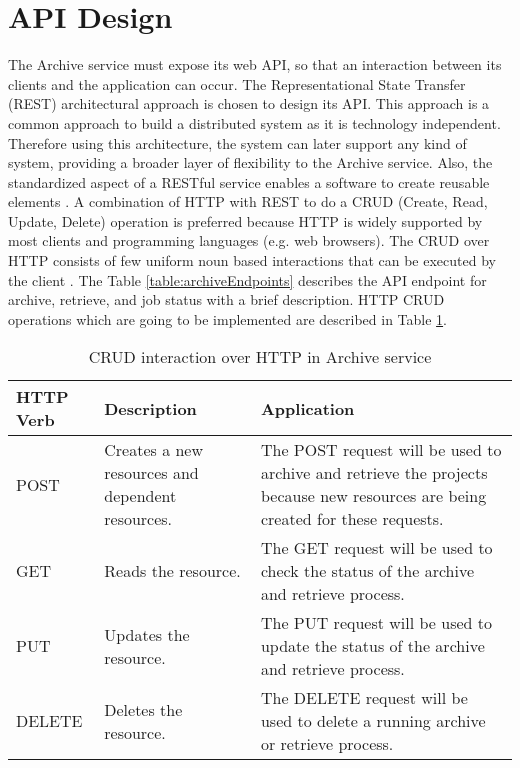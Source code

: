 \section{API Design}
\label{section:APIDesign}
    The Archive service must expose its web API, so that an interaction between its clients and the application can occur.
    The Representational State Transfer (REST) \cite[Chapter.~5]{REST} architectural approach is chosen to design its API. This approach is a 
    common approach to build a distributed system as it is technology independent. Therefore using this architecture, the system can later 
    support any kind of system, providing a broader layer of flexibility to the Archive service. 
    Also, the standardized aspect of a RESTful service enables a software to create reusable elements \cite{RESTThesis}. A combination of HTTP with REST 
    to do a CRUD (Create, Read, Update, Delete) operation is preferred because HTTP is widely supported by most clients and programming languages (e.g. web browsers).
    The CRUD over HTTP consists of few uniform noun based interactions that can be executed by the client \cite[p.~13]{RESTThesis}. The
    Table \ref{table:archiveEndpoints} describes the API endpoint for archive, retrieve, and job status with a brief description.
    HTTP CRUD operations which are going to be implemented are described in Table \ref{table:curdHttp}. 

    \begin{table}[H]
        \centering
        \begin{tabular}{|p{2cm}|p{4cm}|p{7.5cm}|}
            \hline
                \textbf{HTTP Verb}  & \textbf{Description} & \textbf{Application}\\
            \hline
                POST & 
                Creates a new resources and dependent resources.
                & The POST request will be used to archive and retrieve the projects because new resources are being created for these requests.\\
            \hline
                GET & Reads the resource. & The GET request will be used to check the status of the archive and retrieve process. \\
            \hline
            PUT & Updates the resource. & The PUT request will be used to update the status of the archive and retrieve process. \\
            \hline
                DELETE & Deletes the resource. & The DELETE request will be used to delete a running archive or retrieve process. \\                
            \hline
        \end{tabular}
        \caption{CRUD interaction over HTTP in Archive service}
        \label{table:curdHttp}     
    \end{table}   
    
